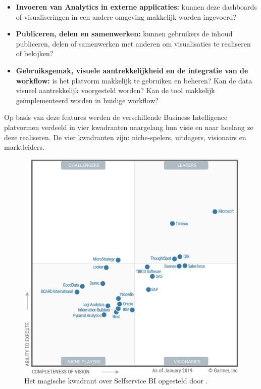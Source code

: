 \begin{itemize}
	\item \textbf{Invoeren van Analytics in externe applicaties:} kunnen deze dashboards of visualiseringen in een andere omgeving makkelijk worden ingevoerd?
	\item \textbf{Publiceren, delen en samenwerken: } kunnen gebruikers de inhoud publiceren, delen of samenwerken met anderen om visualisaties te realiseren of bekijken?
	\item \textbf{Gebruiksgemak, visuele aantrekkelijkheid en de integratie van de workflow:} is het platvorm makkelijk te gebruiken en beheren? Kan de data visueel aantrekkelijk voorgesteld worden? Kan de tool makkelijk geïmplementeerd worden in huidige workflow?
\end{itemize} 

Op basis van deze features werden de verschillende Business Intelligence platvormen verdeeld in vier kwadranten naargelang hun visie en naar hoelang ze deze realiseren. De vier kwadranten zijn: niche-spelers, uitdagers, visionairs en marktleiders.

\begin{figure}[h]
	\centering
	\includegraphics[scale=0.7]{../images/gartner.png}
	\caption{Het magische kwadrant over Selfservice BI opgesteld door \textcite{Gartner2019}.}
	\label{fig:dvmode}
\end{figure}

